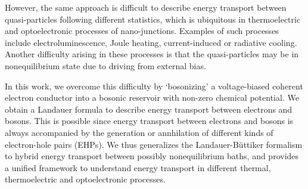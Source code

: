 \documentclass[aps,prb,
,floatfix,footinbib,shortbibliography,
preprint
]{revtex4-1}
\begin{document}

However, the same approach is difficult to describe energy transport between quasi-particles following different statistics, which is ubiquitous in thermoelectric and optoelectronic processes of nano-junctions. Examples of such processes include electroluminescence\cite{kuhnke2017atomic,galeprin2017photonics,schneider2010optical,schneider2012light}, Joule heating\cite{huang2007local,ioffe2008detection,lu_current-induced_2015,hartle2011resonant,hartle2011vibrational,hartle2018cooling}, current-induced\cite{galperin2009cooling,simine2012vibrational,lykkebo2016single,hartle2011resonant} or radiative cooling\cite{zhu2019near}. Another difficulty arising in these processes is that the quasi-particles may be in nonequilibrium state due to driving from external bias.

In this work, we overcome this difficulty by `bosonizing' a voltage-biased coherent electron conductor into a bosonic reservoir with non-zero chemical potential. We obtain a Landauer formula to describe energy transport between electrons and bosons. This is possible since energy transport between electrons and bosons is always accompanied by the generation or annhilation of different kinds of electron-hole pairs (EHPs)\cite{headgordon_molecular_1995,dou2018perspective}. We thus generalizes the Landauer-B\"uttiker formalism to hybrid energy transport between possibly nonequilibrium baths, and provides a unified framework to understand energy transport in different thermal, thermoelectric and optoelectronic processes.  
\end{document}
